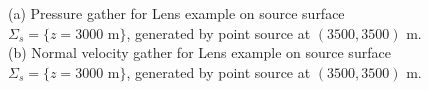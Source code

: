\documentclass[12pt]{geophysics}
\begin{document}
\begin{figure}
  \centering
  \caption{(a) Pressure gather for Lens example on source surface
    $\Sigma_s=\{z=3000\mbox{ m}\}$, generated by point source at
    $(3500,3500)$ m. (b) Normal velocity gather for Lens example on source surface
    $\Sigma_s=\{z=3000\mbox{ m}\}$, generated by point source at
    $(3500,3500)$ m.}
\end{figure}
\end{document}
